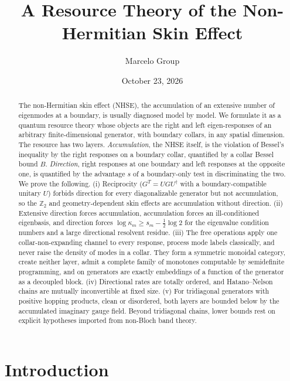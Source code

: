 \documentclass[11pt]{article}
\title{A Resource Theory of the Non-Hermitian Skin Effect}
\author{Marcelo Group}
\date{October 23, 2026}
\theoremstyle{definition}
\theoremstyle{remark}
\begin{document}
\maketitle

\begin{abstract}
The non-Hermitian skin effect (NHSE), the accumulation of an extensive number of eigenmodes at a boundary, is usually diagnosed model by model. We formulate it as a quantum resource theory whose objects are the right and left eigen-responses of an arbitrary finite-dimensional generator, with boundary collars, in any spatial dimension. The resource has two layers. \emph{Accumulation}, the NHSE itself, is the violation of Bessel's inequality by the right responses on a boundary collar, quantified by a collar Bessel bound $B$. \emph{Direction}, right responses at one boundary and left responses at the opposite one, is quantified by the advantage $s$ of a boundary-only test in discriminating the two. We prove the following.
(i) Reciprocity ($G^T=UGU^\dagger$ with a boundary-compatible unitary $U$) forbids direction for every diagonalizable generator but not accumulation, so the $\mathbb Z_2$ and geometry-dependent skin effects are accumulation without direction.
(ii) Extensive direction forces accumulation, accumulation forces an ill-conditioned eigenbasis, and direction forces $\log\kappa_m\ge s_m-\tfrac12\log2$ for the eigenvalue condition numbers and a large directional resolvent residue.
(iii) The free operations apply one collar-non-expanding channel to every response, process mode labels classically, and never raise the density of modes in a collar. They form a symmetric monoidal category, create neither layer, admit a complete family of monotones computable by semidefinite programming, and on generators are exactly embeddings of a function of the generator as a decoupled block.
(iv) Directional rates are totally ordered, and Hatano--Nelson chains are mutually inconvertible at fixed size.
(v) For tridiagonal generators with positive hopping products, clean or disordered, both layers are bounded below by the accumulated imaginary gauge field. Beyond tridiagonal chains, lower bounds rest on explicit hypotheses imported from non-Bloch band theory.
\end{abstract}

\section{Introduction}
\label{sec:intro}
\end{document}
